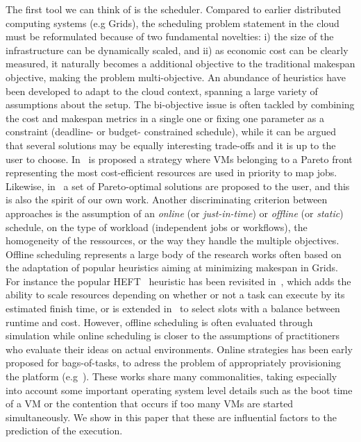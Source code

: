 \documentclass[10pt,conference,compsocconf]{IEEEtran}
\begin{document}
The first tool we can think of is the scheduler. Compared to earlier distributed
computing systems  (e.g Grids),  the scheduling problem  statement in  the cloud
must be  reformulated because of two  fundamental novelties: i) the  size of the
infrastructure  can be  dynamically  scaled, and  ii) as  economic  cost can  be
clearly measured, it naturally becomes a additional objective to the traditional
makespan  objective,  making  the   problem  multi-objective.   An abundance  of
heuristics have been  developed to adapt to the cloud  context, spanning a large
variety of assumptions about the setup.  The bi-objective issue is often tackled
by  combining the  cost and  makespan  metrics in  a  single one  or fixing  one
parameter as a constraint (deadline-  or budget- constrained schedule), while it
can be argued  that several solutions may be equally  interesting trade-offs and
it is up to the user to choose.  In~\cite{Su13} is proposed a strategy where VMs
belonging to a  Pareto front representing the most  cost-efficient resources are
used  in  priority  to  map  jobs.  Likewise,  in~\cite{Durillo14}  a  set  of
Pareto-optimal solutions are  proposed to the user, and this  is also the spirit
of our  own work.   Another discriminating criterion  between approaches  is the
assumption of  an \emph{online}  (or \emph{just-in-time}) or  \emph{offline} (or
\emph{static})  schedule,  on   the  type  of  workload   (independent  jobs  or
workflows),  the homogeneity  of  the ressources,  or the  way  they handle  the
multiple objectives.  Offline scheduling represents a large body of the research
works often based  on the adaptation of popular heuristics  aiming at minimizing
makespan in Grids.  For instance  the popular HEFT~\cite{Zhao2003} heuristic has
been  revisited in~\cite{LinL11},  which  adds the  ability  to scale  resources
depending on whether or not a task  can execute by its estimated finish time, or
is extended in~\cite{Li11cost-conscious} to select  slots with a balance between
runtime  and  cost.  However,  offline  scheduling  is often  evaluated  through
simulation while online scheduling is closer to the assumptions of practitioners
who evaluate  their ideas  on actual environments.   Online strategies  has been
early  proposed  for  bags-of-tasks,  to adress  the  problem  of  appropriately
provisioning                             the                            platform
(e.g~\cite{MarshallKF10,GenaudG11,DuongLG11,VillegasASI12}).  These  works share
many  commonalities, taking  especially  into account  some important  operating
system level details such as the boot time of a VM or the contention that occurs
if too many VMs are started simultaneously. We show in this paper that these are
influential factors to the prediction of the execution.
  
\end{document}
